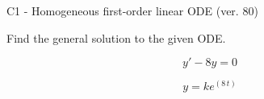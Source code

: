 \begin{exercise}
  \begin{exerciseTitle}C1 - Homogeneous first-order linear ODE (ver. 80)\end{exerciseTitle}
  \begin{exerciseStatement}
    
Find the general solution to the given ODE.

    
\[y'-8y=0\]

  \end{exerciseStatement}
  \begin{exerciseAnswer}
    
\[y= k e^{\left(8 \, t\right)}\]

  \end{exerciseAnswer}
\end{exercise}